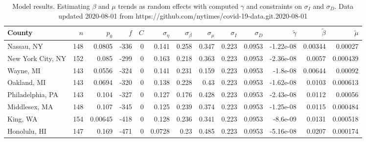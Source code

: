 \documentclass[12pt,letterpaper]{article}
\begin{document}
\begin{sidewaystable}
\caption{\label{tab:cons}
Model results. Estimating $\beta$ and $\mu$ trends as random effects with computed $\gamma$
and constraints on  $\sigma_I$ and $\sigma_D$. 
Data updated 2020-08-01 from https://github.com/nytimes/covid-19-data.git.2020-08-01
}
\centering
{\footnotesize


\begin{tabular}{lrrrrrrrrrrrr}
\hline
 County             &   $n$ &   $p_0$ &   $f$ &   $C$ &   $\sigma_\eta$ &   $\sigma_\beta$ &   $\sigma_\mu$ &   $\sigma_I$ &   $\sigma_D$ &   $\tilde\gamma$ &   $\tilde{\beta}$ &   $\tilde{\mu}$ \\
\hline
 Nassau, NY         & 148   & 0.0805  &  -336 &     0 &          0.141  &            0.258 &         0.347  &        0.223 &       0.0953 &        -1.22e-08 &           0.00344 &        0.00027  \\
 New York City, NY  & 152   & 0.085   &  -299 &     0 &          0.163  &            0.218 &         0.363  &        0.223 &       0.0953 &        -2.36e-08 &           0.0057  &        0.000439 \\
 Wayne, MI          & 143   & 0.0556  &  -324 &     0 &          0.141  &            0.231 &         0.159  &        0.223 &       0.0953 &        -1.8e-08  &           0.00644 &        0.00092  \\
 Oakland, MI        & 143   & 0.0694  &  -320 &     0 &          0.138  &            0.228 &         0.43   &        0.223 &       0.0953 &        -1.62e-08 &           0.0103  &        0.000613 \\
 Philadelphia, PA   & 143   & 0.104   &  -327 &     0 &          0.127  &            0.176 &         0.428  &        0.223 &       0.0953 &        -2.43e-08 &           0.0112  &        0.00056  \\
 Middlesex, MA      & 148   & 0.107   &  -345 &     0 &          0.125  &            0.239 &         0.374  &        0.223 &       0.0953 &        -1.25e-08 &           0.0115  &        0.000484 \\
 King, WA           & 154   & 0.00645 &  -418 &     0 &          0.128  &            0.236 &         0.341  &        0.223 &       0.0953 &        -8.6e-09  &           0.0131  &        0.000518 \\
 Honolulu, HI       & 147   & 0.169   &  -471 &     0 &          0.0728 &            0.23  &         0.485  &        0.223 &       0.0953 &        -5.16e-08 &           0.0207  &        0.000174 \\

\end{tabular}}
\end{sidewaystable}
\end{document}
